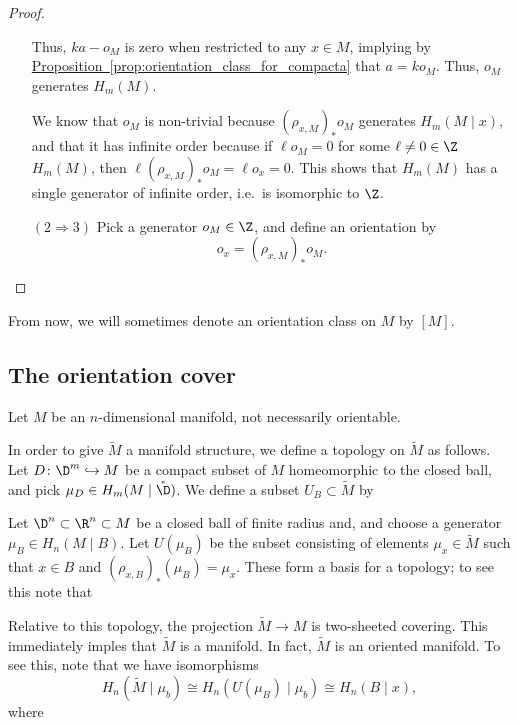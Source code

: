 \documentclass[main.tex]{subfiles}
\begin{document}
\begin{proof}
\begin{enumerate}[leftmargin=4em]
      Thus, \(ka - o_{M}\) is zero when restricted to any \(x \in M\), implying by \hyperref[prop:orientation_class_for_compacta]{Proposition~\ref*{prop:orientation_class_for_compacta}} that \(a = k o_{M}\). Thus, \(o_{M}\) generates \(H_{m}(M)\).

      We know that \(o_{M}\) is non-trivial because \((\rho_{x, M})_{*} o_{M}\) generates \(H_{m}(M \mid x)\), and that it has infinite order because if \(\ell o_{M} = 0\) for some \(\ell \neq 0 \in \Z\) \(H_{m}(M)\), then \(\ell (\rho_{x, M})_{*}o_{M} = \ell o_{x} = 0\). This shows that \(H_{m}(M)\) has a single generator of infinite order, i.e.\ is isomorphic to \(\Z\).


    \item[\((2 \Rightarrow 3)\)] Pick a generator \(o_{M} \in \Z\), and define an orientation by
      \begin{equation*}
        o_{x} = (\rho_{x, M})_{*} o_{M}.
      \end{equation*}
  \end{enumerate}
\end{proof}

From now, we will sometimes denote an orientation class on \(M\) by \([M]\).

\subsection{The orientation cover}
\label{ssc:the_orientation_cover}

Let \(M\) be an \(n\)-dimensional manifold, not necessarily orientable.

In order to give \(\tilde{M}\) a manifold structure, we define a topology on \(\tilde{M}\) as follows. Let \(D\colon \D^{m} \hookrightarrow M\) be a compact subset of \(M\) homeomorphic to the closed ball, and pick \(\mu_{D} \in H_{m}(M \mid \mathring{\D})\). We define a subset \(U_{B} \subset \tilde{M}\) by

Let \(\D^{n} \subset \R^{n} \subset M\) be a closed ball of finite radius and, and choose a generator \(\mu_{B} \in H_{n}(M \mid B)\). Let \(U(\mu_{B})\) be the subset consisting of elements \(\mu_{x} \in \tilde{M}\) such that \(x \in B\) and \((\rho_{x,B})_{*}(\mu_{B}) = \mu_{x}\). These form a basis for a topology; to see this note that

Relative to this topology, the projection \(\tilde{M} \to M\) is two-sheeted covering. This immediately imples that \(\tilde{M}\) is a manifold. In fact, \(\tilde{M}\) is an oriented manifold. To see this, note that we have isomorphisms
\begin{equation*}
  H_{n}(\tilde{M} \mid \mu_{b}) \cong H_{n}(U(\mu_{B}) \mid \mu_{b}) \cong H_{n}(B \mid x),
\end{equation*}
where
\end{document}
